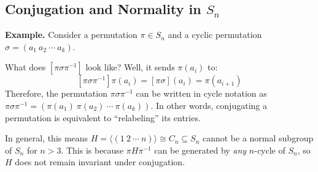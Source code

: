 \subsection{Conjugation and Normality in $S_n$}

\textbf{Example.} Consider a permutation $\pi \in S_n$ and a cyclic permutation $\sigma = (a_1 \ a_2 \ \cdots \ a_k)$.  

What does $[ \pi \sigma \pi^{-1} ]$ look like?  Well, it sends $\pi(a_i)$ to:
\[ [ \pi \sigma \pi^{-1} ] \pi(a_i) = [ \pi \sigma ] (a_i) = \pi(a_{i + 1}) \]
Therefore, the permutation $\pi \sigma \pi^{-1}$ can be written in cycle notation as $\pi \sigma \pi^{-1} = (\pi(a_1) \ \pi(a_2) \ \cdots \ \pi(a_k))$.  In other words, conjugating a permutation is equivalent to ``relabeling'' its entries.

In general, this means $H = \langle ( 1 \ 2 \ \cdots \ n ) \rangle \cong C_n \subseteq S_n$ cannot be a normal subgroup of $S_n$ for $n > 3$.  This is because $\pi H \pi^{-1}$ can be generated by \emph{any} $n$-cycle of $S_n$, so $H$ does not remain invariant under conjugation.

